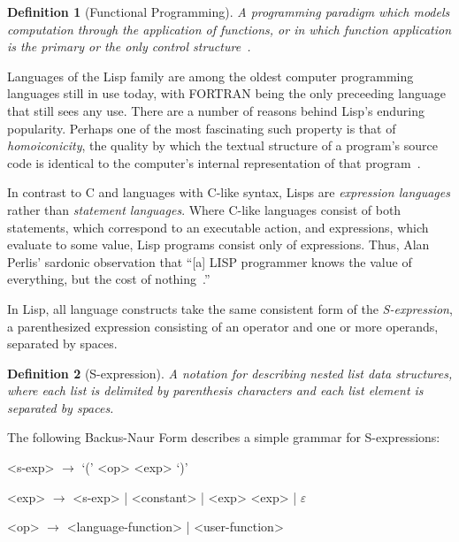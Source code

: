 \documentclass[11pt,a4paper]{article}
\theoremstyle{break}
\newtheorem{defn}{Definition}
\begin{document}
\begin{defn}[Functional Programming]
A programming paradigm which models computation through the application of functions, or in which function application is the primary or the only control structure~\cite{Wise:2003:FP:1074100.1074416}.
\end{defn}

Languages of the Lisp family are among the oldest computer programming languages still in use today, with FORTRAN being the only preceeding language that still sees any use. There are a number of reasons behind Lisp's enduring popularity. Perhaps one of the most fascinating such property is that of \textit{homoiconicity}, the quality by which the textual structure of a program's source code is identical to the computer's internal representation of that program~\cite{vanderhart2010macros,sicp}.

In contrast to C and languages with C-like syntax, Lisps are \textit{expression languages} rather than \textit{statement languages}. Where C-like languages consist of both statements, which correspond to an executable action, and expressions, which evaluate to some value, Lisp programs consist only of expressions. Thus, Alan Perlis' sardonic observation that ``[a] LISP programmer knows the value of everything, but the cost of nothing~\cite{Perlis:1982:SFE:947955.1083808}.''

In Lisp, all language constructs take the same consistent form of the \textit{S-expression}, a parenthesized expression consisting of an operator and one or more operands, separated by spaces.

\begin{defn}[S-expression]
A notation for describing nested list data structures, where each list is delimited by parenthesis characters and each list element is separated by spaces.
\end{defn}

The following Backus-Naur Form describes a simple grammar for S-expressions:

\begin{listing}[h!]
    \centering
    \begin{grammar}
      <s-exp> $\to$ `(' <op> <exp> `)'

      <exp>  $\to$ <s-exp>  | <constant> | <exp> <exp> | $\varepsilon$

      <op>  $\to$ <language-function> | <user-function>
    \end{grammar}
    \caption{Backus-Naur form for a S-expression grammar~\cite{r6rs}.}
\end{listing}
\end{document}
